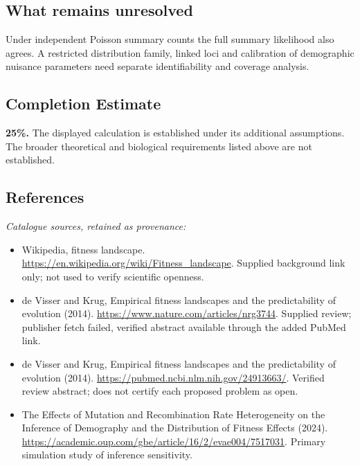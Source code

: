 \documentclass[11pt]{article}
\begin{document}
\subsection{What remains unresolved}
Under independent Poisson summary counts the full summary likelihood also agrees. A restricted distribution family, linked loci and calibration of demographic nuisance parameters need separate identifiability and coverage analysis.
\subsection{Completion Estimate}
\textbf{25\%.} The displayed calculation is established under its additional assumptions. The broader theoretical and biological requirements listed above are not established.
\subsection{References}
\noindent\emph{Catalogue sources, retained as provenance:}
\begin{itemize}
\item Wikipedia, fitness landscape. \url{https://en.wikipedia.org/wiki/Fitness_landscape}. Supplied background link only; not used to verify scientific openness.
\item de Visser and Krug, Empirical fitness landscapes and the predictability of evolution (2014). \url{https://www.nature.com/articles/nrg3744}. Supplied review; publisher fetch failed, verified abstract available through the added PubMed link.
\item de Visser and Krug, Empirical fitness landscapes and the predictability of evolution (2014). \url{https://pubmed.ncbi.nlm.nih.gov/24913663/}. Verified review abstract; does not certify each proposed problem as open.
\item The Effects of Mutation and Recombination Rate Heterogeneity on the Inference of Demography and the Distribution of Fitness Effects (2024). \url{https://academic.oup.com/gbe/article/16/2/evae004/7517031}. Primary simulation study of inference sensitivity.
\end{itemize}
\end{document}
